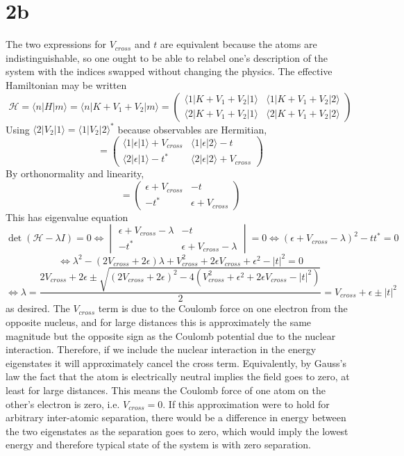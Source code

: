 \documentclass{article}
\begin{document}
\section*{2b}
The two expressions for $V_{cross}$ and $t$ are equivalent because the atoms are indistinguishable, so one ought to be able to relabel
one's description of the system with the indices swapped without changing the physics.
The effective Hamiltonian may be written
\[\mathcal{H}=\langle n|H|m  \rangle=\langle n|K+V_{1}+V_{2}|m \rangle=
  \begin{pmatrix}
    \langle 1|K+V_{1}+V_{2}|1 \rangle & \langle 1 | K+V_{1}+V_{2}|2 \rangle \\
    \langle  2|K+V_{1}+V_{2}|1\rangle & \langle 2 | K+V_{1}+V_{2}|2 \rangle
  \end{pmatrix}
\]
Using $\langle 2|V_{2}|1  \rangle=\langle 1|V_{2}|2 \rangle^{*}$ because observables are Hermitian,
\[
  =
  \begin{pmatrix}
    \langle 1|\epsilon|1 \rangle + V_{cross} & \langle 1|\epsilon|2  \rangle -t \\
    \langle 2|\epsilon|1 \rangle - t^{*} & \langle 2|\epsilon|2 \rangle + V_{cross}
  \end{pmatrix}
\]
By orthonormality and linearity,
\[
  =
  \begin{pmatrix}
    \epsilon+V_{cross} & -t \\
    -t^{*} & \epsilon+V_{cross}
  \end{pmatrix}
\]
This has eigenvalue equation
\[
  \det(\mathcal{H}-\lambda I) = 0
  \Leftrightarrow
  \begin{vmatrix}
    \epsilon+V_{cross}-\lambda & -t \\
    -t^{*} & \epsilon+V_{cross}-\lambda
  \end{vmatrix}=0
  \Leftrightarrow (\epsilon+V_{cross}-\lambda)^{2}-tt^{*}=0
\]
\[
  \Leftrightarrow \lambda^{2}-(2V_{cross}+2\epsilon)\lambda + V_{cross}^{2}+2\epsilon V_{cross}+\epsilon^{2}-|t|^{2}=0
\]
\[
  \Leftrightarrow \lambda =\frac{2V_{cross}+2\epsilon\pm\sqrt{(2V_{cross}+2\epsilon)^{2}
      -4(V_{cross}^{2}+\epsilon^{2}+2\epsilon V_{cross}-|t|^{2})}}{2}
  =V_{cross}+\epsilon\pm|t|^{2}
\]
as desired.
The $V_{cross}$ term is due to the Coulomb force on one electron from the opposite nucleus, and for large distances this is approximately
the same magnitude but the opposite sign as the Coulomb potential due to the nuclear interaction.
Therefore, if we include the nuclear interaction in the energy eigenstates it will approximately cancel the cross term.
Equivalently, by Gauss's law the fact that the atom is electrically neutral implies the field goes to zero, at least for large distances.
This means the Coulomb force of one atom on the other's electron is zero, i.e. $V_{cross}=0$.
If this approximation were to hold for arbitrary inter-atomic separation, there would be a difference in energy between the two
eigenstates as the separation goes to zero, which would imply the lowest energy and therefore typical state of the system is
with zero separation.
\end{document}
